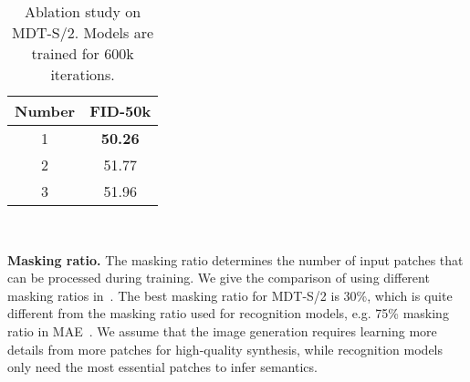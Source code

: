 \documentclass[final]{cvpr}
\newcommand{\myPara}[1]{\vspace{.08in} \noindent\textbf{#1}}
\begin{document}
\begin{table*}
{\begin{tabular}{cc}
\toprule
Number & FID-50k \\	\midrule
1 &     \textbf{50.26}  \\ 
2 &       51.77 \\ 
3 &       51.96  \\ 
\bottomrule
\end{tabular}
\label{tab:num_block_si}
} \\
\caption{Ablation study on MDT-S/2. Models are trained for 600k iterations. 
}
\end{table*}

\myPara{Masking ratio.} 
The masking ratio determines the number of input patches that
can be processed during training.
We give the comparison of using different masking ratios
in~.
The best masking ratio for MDT-S/2 is 30\%,
which is quite different from the masking ratio used
for recognition models, e.g.   75\%
masking ratio in MAE~\cite{he2022masked}.
We assume that 
the image generation requires learning
more details from more patches for high-quality synthesis,
while recognition models only need
the most essential patches to infer semantics.
\end{document}
